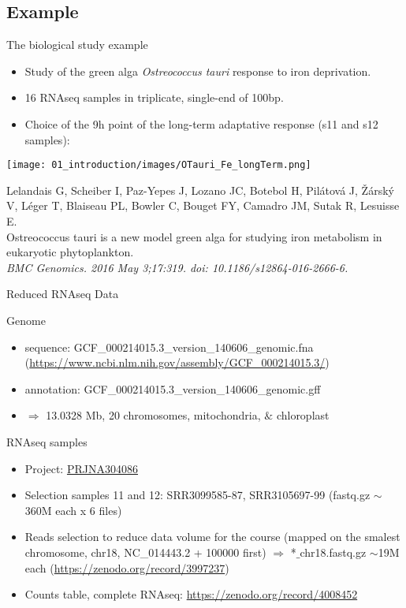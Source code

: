 \subsection*{Example}
\begin{frame}{The biological study example}
\begin{itemize}
    \item Study of the green alga {\it Ostreococcus tauri} response to iron deprivation. 
    \item 16 RNAseq samples in triplicate, single-end of 100bp.
    \item Choice of the 9h point of the long-term adaptative response (s11 and s12 samples):
\end{itemize}
\begin{center}
   \texttt{[image: 01\_introduction/images/OTauri\_Fe\_longTerm.png]}
\end{center}

\tiny{
Lelandais G, Scheiber I, Paz-Yepes J, Lozano JC, Botebol H, Pilátová J, Žárský V, Léger T, Blaiseau PL, Bowler C, Bouget FY, Camadro JM, Sutak R, Lesuisse E.\\
Ostreococcus tauri is a new model green alga for studying iron metabolism in eukaryotic phytoplankton.\\
\it{BMC Genomics}. 2016 May 3;17:319. doi: 10.1186/s12864-016-2666-6.}
\end{frame}
\begin{frame}{Reduced RNAseq Data}
\begin{block}{Genome}
    \begin{itemize}
        \item sequence: GCF\_000214015.3\_version\_140606\_genomic.fna (\url{https://www.ncbi.nlm.nih.gov/assembly/GCF_000214015.3/})
        \item annotation: GCF\_000214015.3\_version\_140606\_genomic.gff
        \item $\Rightarrow$ 13.0328 Mb, 20 chromosomes, mitochondria, $\&$ chloroplast
    \end{itemize}
\end{block}
\begin{block}{RNAseq samples}
    \begin{itemize}
      \item Project: \href{https://www.ebi.ac.uk/ena/browser/view/PRJNA304086}{PRJNA304086}
      \item Selection samples 11 and 12: SRR3099585-87, SRR3105697-99 (fastq.gz ${\sim}$360M each x 6 files)
      \item Reads selection to reduce data volume for the course (mapped on the smalest chromosome, chr18, NC\_014443.2 + 100000 first) $\Rightarrow$ *$\_$chr18.fastq.gz ${\sim}$19M each (\small{\url{https://zenodo.org/record/3997237}})
      \item Counts table, complete RNAseq: \small{\url{https://zenodo.org/record/4008452}}
    \end{itemize}
\end{block}
\end{frame}
